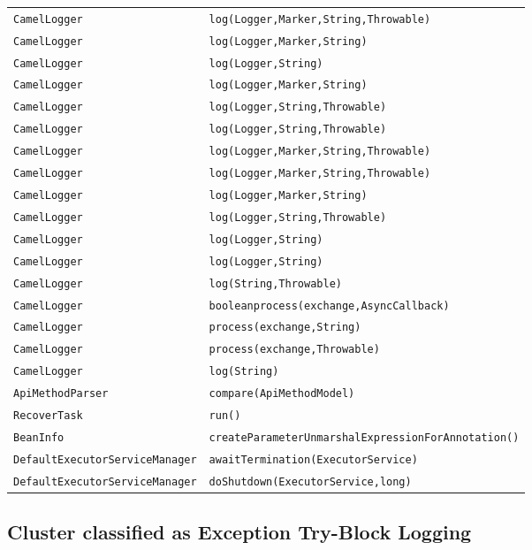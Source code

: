 \begin{center}
\begin{longtable}{ll}
\lstinline/CamelLogger/&{\lstinline/log(Logger,Marker,String,Throwable)/}\\
\lstinline/CamelLogger/&{\lstinline/log(Logger,Marker,String)/}\\
\lstinline/CamelLogger/&{\lstinline/log(Logger,String)/}\\
\lstinline/CamelLogger/&{\lstinline/log(Logger,Marker,String)/}\\
\lstinline/CamelLogger/&{\lstinline/log(Logger,String,Throwable)/}\\
\lstinline/CamelLogger/&{\lstinline/log(Logger,String,Throwable)/}\\
\lstinline/CamelLogger/&{\lstinline/log(Logger,Marker,String,Throwable)/}\\
\lstinline/CamelLogger/&{\lstinline/log(Logger,Marker,String,Throwable)/}\\
\lstinline/CamelLogger/&{\lstinline/log(Logger,Marker,String)/}\\
\lstinline/CamelLogger/&{\lstinline/log(Logger,String,Throwable)/}\\
\lstinline/CamelLogger/&{\lstinline/log(Logger,String)/}\\
\lstinline/CamelLogger/&{\lstinline/log(Logger,String)/}\\
\lstinline/CamelLogger/&{\lstinline/log(String,Throwable)/}\\
\lstinline/CamelLogger/&{\lstinline/booleanprocess(exchange,AsyncCallback)/}\\
\lstinline/CamelLogger/&{\lstinline/process(exchange,String)/}\\
\lstinline/CamelLogger/&{\lstinline/process(exchange,Throwable)/}\\
\lstinline/CamelLogger/&{\lstinline/log(String)/}\\
\lstinline/ApiMethodParser/&{\lstinline/compare(ApiMethodModel)/}\\
\lstinline/RecoverTask/&{\lstinline/run()/}\\
\lstinline/BeanInfo/&{\lstinline/createParameterUnmarshalExpressionForAnnotation()/}\\
\lstinline/DefaultExecutorServiceManager/&{\lstinline/awaitTermination(ExecutorService)/}\\
\lstinline/DefaultExecutorServiceManager/&{\lstinline/doShutdown(ExecutorService,long)/}\\
\end{longtable}
\end{center}

\subsection{Cluster classified as Exception Try-Block Logging}

